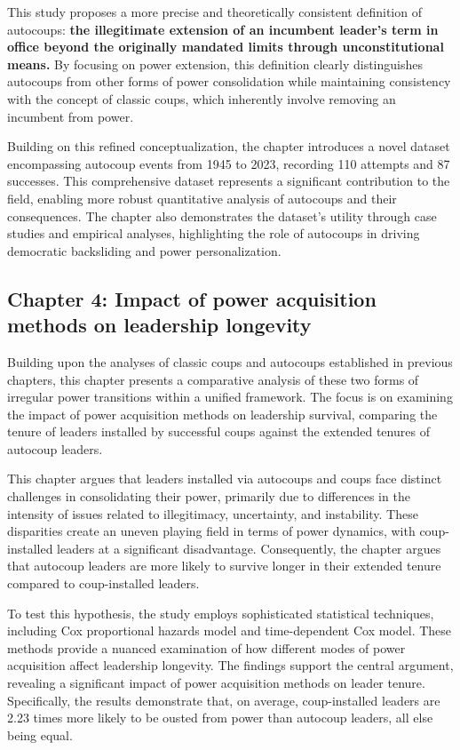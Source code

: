 \documentclass[
  12pt,
]{report}
\begin{document}
This study proposes a more precise and theoretically consistent
definition of autocoups: \textbf{the illegitimate extension of an
incumbent leader's term in office beyond the originally mandated limits
through unconstitutional means.} By focusing on power extension, this
definition clearly distinguishes autocoups from other forms of power
consolidation while maintaining consistency with the concept of classic
coups, which inherently involve removing an incumbent from power.

Building on this refined conceptualization, the chapter introduces a
novel dataset encompassing autocoup events from 1945 to 2023, recording
110 attempts and 87 successes. This comprehensive dataset represents a
significant contribution to the field, enabling more robust quantitative
analysis of autocoups and their consequences. The chapter also
demonstrates the dataset's utility through case studies and empirical
analyses, highlighting the role of autocoups in driving democratic
backsliding and power personalization.

\subsection*{Chapter 4: Impact of power acquisition methods on
leadership
longevity}\label{chapter-4-impact-of-power-acquisition-methods-on-leadership-longevity}

Building upon the analyses of classic coups and autocoups established in
previous chapters, this chapter presents a comparative analysis of these
two forms of irregular power transitions within a unified framework. The
focus is on examining the impact of power acquisition methods on
leadership survival, comparing the tenure of leaders installed by
successful coups against the extended tenures of autocoup leaders.

This chapter argues that leaders installed via autocoups and coups face
distinct challenges in consolidating their power, primarily due to
differences in the intensity of issues related to illegitimacy,
uncertainty, and instability. These disparities create an uneven playing
field in terms of power dynamics, with coup-installed leaders at a
significant disadvantage. Consequently, the chapter argues that autocoup
leaders are more likely to survive longer in their extended tenure
compared to coup-installed leaders.

To test this hypothesis, the study employs sophisticated statistical
techniques, including Cox proportional hazards model and time-dependent
Cox model. These methods provide a nuanced examination of how different
modes of power acquisition affect leadership longevity. The findings
support the central argument, revealing a significant impact of power
acquisition methods on leader tenure. Specifically, the results
demonstrate that, on average, coup-installed leaders are 2.23 times more
likely to be ousted from power than autocoup leaders, all else being
equal.
\end{document}
